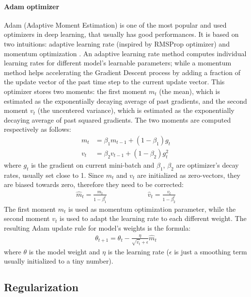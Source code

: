 \paragraph{Adam optimizer} Adam (Adaptive Moment Estimation) is one of the most popular and used optimizers in deep learning, that usually has good performances. It is based on two intuitions: adaptive learning rate (inspired by RMSProp optimizer) and momentum optimization \cite{arXiv:adam} \cite{arXiv:optimizers}. An adaptive learning rate method computes individual learning rates for different model's learnable parameters; while a momentum method helps accelerating the Gradient Descent process by adding a fraction of the update vector of the past time step to the current update vector. This optimizer stores two moments: the first moment $m_t$ (the mean), which is estimated as the exponentially decaying average of past gradients, and the second moment $v_t$ (the uncentered variance), which is estimated as the exponentially decaying average of past squared gradients. The two moments are computed respectively as follows:
\begin{align}
    m_{t} &=\beta_{1} m_{t-1}+\left(1-\beta_{1}\right) g_{t} \\
    v_{t} &=\beta_{2} v_{t-1}+\left(1-\beta_{2}\right) g_{t}^{2}
\end{align}
where $g_{t}$ is the gradient on current mini-batch and $\beta_1$, $\beta_2$ are optimizer's decay rates, usually set close to 1. Since $m_t$ and $v_t$ are initialized as zero-vectors, they are biased towards zero, therefore they need to be corrected:
\begin{align}
    \hat{m}_{t} =\frac{m_{t}}{1-\beta_{1}^{t}} \qquad\qquad\qquad
    \hat{v}_{t} =\frac{v_{t}}{1-\beta_{2}^{t}}
\end{align}
The first moment $m_t$ is used as momentum optimization parameter, while the second moment $v_t$ is used to adapt the learning rate to each different weight. The resulting Adam update rule for model's weights is the formula:
\begin{align}
    \theta_{t+1}=\theta_{t}-\frac{\eta}{\sqrt{\hat{v}_{t}}+\epsilon} \hat{m}_{t}
\end{align}
where $\theta$ is the model weight and $\eta$ is the learning rate ($\epsilon$ is just a smoothing term usually initialized to a tiny number).

\subsection{Regularization}
